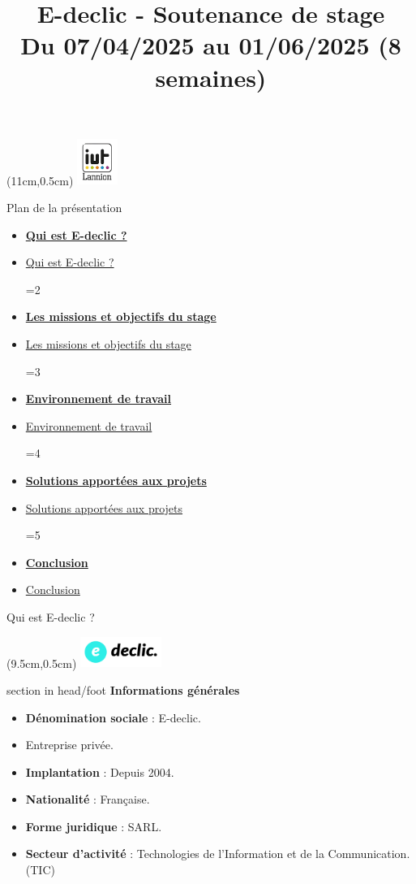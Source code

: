 \documentclass{beamer}
\title[IUT Lannion -- Soutenance Stage]{E-declic - Soutenance de stage \\ \normalsize Du 07/04/2025 au 01/06/2025 (8 semaines)}
\author{\NomPrenom}
\institute{IUT de Lannion -- Département Informatique}
\date{\DateSoutenance}
\newcommand{\logoEdeclic}{
	\begin{textblock*}{2cm}(9.5cm,0.5cm)
  		\includegraphics[height=1cm]{../img/logo_e-declic.png}
	\end{textblock*}
}
\newcommand{\planLine}[4]{
  \ifnum#1=#2
    \item \hyperlink{#3}{\textbf{\large #4}}
  \else
    \item \hyperlink{#3}{#4}
  \fi
}
\newcommand{\planSlide}[1]{
  	\begin{frame}{Plan de la présentation}
  		\begin{center}
  			\begin{minipage}{1\textwidth}
				\begin{itemize}
      			\planLine{#1}{1}{organisation}{Qui est E-declic ?}
      			\planLine{#1}{2}{sujet}{Les missions et objectifs du stage}
      			\planLine{#1}{3}{environnement}{Environnement de travail}
      			\planLine{#1}{4}{realisation}{Solutions apportées aux projets}
      			\planLine{#1}{5}{conclusion}{Conclusion}
	    		\end{itemize}
  		\end{minipage}
	\end{center}
	\vfill
	\end{frame}
}
\begin{document}
\begin{frame}[plain]
	\begin{minipage}[t]{0.75\textwidth}
    		\titlepage
  	\end{minipage}
	\begin{textblock*}{2cm}(11cm,0.5cm)
    		\includegraphics[height=1.5cm]{../img/logo_iut.png}
	\end{textblock*}
\end{frame}

\planSlide{1}

\begin{frame}[label=organisation]{Qui est E-declic ?}
	\logoEdeclic

	\begin{beamercolorbox}[wd=\paperwidth,ht=1.5em,dp=0.5em,leftskip=0.5cm]{section in head/foot}
  		\large \textbf{Informations générales}
	\end{beamercolorbox}
	\vspace{0.5em}
	\begin{center}
  		\begin{minipage}{0.9\textwidth}
    			\begin{itemize}
      			\item<1-> \textbf{Dénomination sociale} : E-declic.
      			\item<1-> Entreprise privée.
      			\item<2-> \textbf{Implantation} : Depuis 2004.
				\item<2-> \textbf{Nationalité} : Française.
      			\item<2-> \textbf{Forme juridique} : SARL.
      			\item<3-> \textbf{Secteur d'activité} : Technologies de l'Information et de la Communication. (TIC)
    			\end{itemize}
  		\end{minipage}
	\end{center}
	\vfill
\end{frame}
\end{document}

